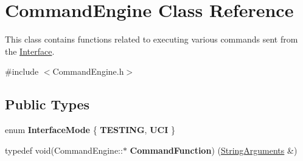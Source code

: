 \hypertarget{classCommandEngine}{}\section{Command\+Engine Class Reference}
\label{classCommandEngine}


This class contains functions related to executing various commands sent from the \hyperlink{classInterface}{Interface}.  




{\ttfamily \#include $<$Command\+Engine.\+h$>$}

\subsection*{Public Types}
\begin{DoxyCompactItemize}
\item 
\mbox{\label{classCommandEngine_ad9c039b48df85947ae760da43e7cedb9}} 
enum {\bfseries Interface\+Mode} \{ {\bfseries T\+E\+S\+T\+I\+NG}, 
{\bfseries U\+CI}
 \}
\item 
\mbox{\label{classCommandEngine_aac6dff88a64e7e98e0500558bf15afa8}} 
typedef void(Command\+Engine\+::$\ast$ {\bfseries Command\+Function}) (\hyperlink{structStringArguments}{String\+Arguments} \&)
\end{DoxyCompactItemize}
